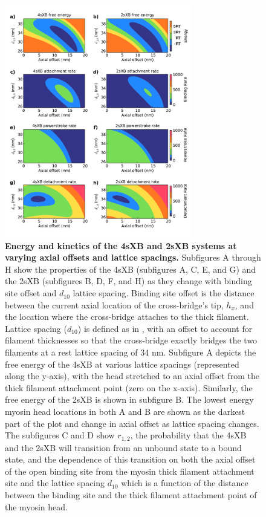 \documentclass[]{article}
\begin{document}
\begin{figure}[ht]
    \begin{center}
    \includegraphics[width=3.2in]{../imgs/Figure2.pdf}
    \caption{
        \label{fig_kinetics_contours}
        \textbf{Energy and kinetics of the 4sXB and 2sXB systems at varying axial offsets and lattice spacings.} 
        Subfigures A through H show the properties of the 4sXB (subfigures A, C, E, and G) and the 2sXB (subfigures B, D, F, and H) as they change with binding site offset and $d_{10}$ lattice spacing.
        Binding site offset is the distance between the current axial location of the cross-bridge's tip, $h_x$, and the location where the cross-bridge attaches to the thick filament.
        Lattice spacing ($d_{10}$) is defined as in \citet{Millman1998}, with an offset to account for filament thicknesses so that the cross-bridge exactly bridges the two filaments at a rest lattice spacing of 34 nm.
        Subfigure A depicts the free energy of the 4sXB at various lattice spacings (represented along the y-axis), with the head stretched to an axial offset from the thick filament attachment point (zero on the x-axis).
        Similarly, the free energy of the 2sXB is shown in subfigure B.
        The lowest energy myosin head locations in both A and B are shown as the darkest part of the plot and change in axial offset as lattice spacing changes.
        The subfigures C and D show $r_{1,2}$, the probability that the 4sXB and the 2sXB will transition from an unbound state to a bound state, and the dependence of this transition on both the axial offset of the open binding site from the myosin thick filament attachment site and the lattice spacing $d_{10}$ which is a function of the distance between the binding site and the thick filament attachment point of the myosin head. 
}
\end{center}
\end{figure}
\end{document}
